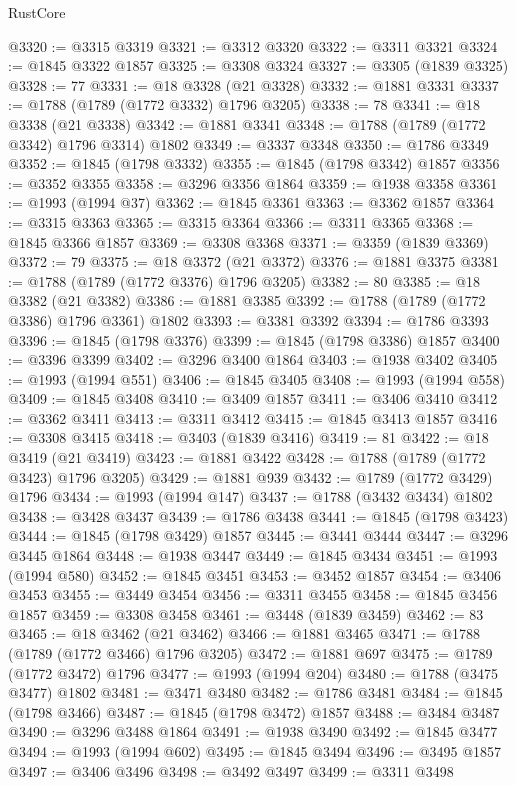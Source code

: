 \begin{lexlean}{RustCore}
\begin{coremodule}
@3320 := @3315 @3319
@3321 := @3312 @3320
@3322 := @3311 @3321
@3324 := @1845 @3322 @1857
@3325 := @3308 @3324
@3327 := @3305 (@1839 @3325)
@3328 := 77
@3331 := @18 @3328 (@21 @3328)
@3332 := @1881 @3331
@3337 := @1788 (@1789 (@1772 @3332) @1796 @3205)
@3338 := 78
@3341 := @18 @3338 (@21 @3338)
@3342 := @1881 @3341
@3348 := @1788 (@1789 (@1772 @3342) @1796 @3314) @1802
@3349 := @3337 @3348
@3350 := @1786 @3349
@3352 := @1845 (@1798 @3332)
@3355 := @1845 (@1798 @3342) @1857
@3356 := @3352 @3355
@3358 := @3296 @3356 @1864
@3359 := @1938 @3358
@3361 := @1993 (@1994 @37)
@3362 := @1845 @3361
@3363 := @3362 @1857
@3364 := @3315 @3363
@3365 := @3315 @3364
@3366 := @3311 @3365
@3368 := @1845 @3366 @1857
@3369 := @3308 @3368
@3371 := @3359 (@1839 @3369)
@3372 := 79
@3375 := @18 @3372 (@21 @3372)
@3376 := @1881 @3375
@3381 := @1788 (@1789 (@1772 @3376) @1796 @3205)
@3382 := 80
@3385 := @18 @3382 (@21 @3382)
@3386 := @1881 @3385
@3392 := @1788 (@1789 (@1772 @3386) @1796 @3361) @1802
@3393 := @3381 @3392
@3394 := @1786 @3393
@3396 := @1845 (@1798 @3376)
@3399 := @1845 (@1798 @3386) @1857
@3400 := @3396 @3399
@3402 := @3296 @3400 @1864
@3403 := @1938 @3402
@3405 := @1993 (@1994 @551)
@3406 := @1845 @3405
@3408 := @1993 (@1994 @558)
@3409 := @1845 @3408
@3410 := @3409 @1857
@3411 := @3406 @3410
@3412 := @3362 @3411
@3413 := @3311 @3412
@3415 := @1845 @3413 @1857
@3416 := @3308 @3415
@3418 := @3403 (@1839 @3416)
@3419 := 81
@3422 := @18 @3419 (@21 @3419)
@3423 := @1881 @3422
@3428 := @1788 (@1789 (@1772 @3423) @1796 @3205)
@3429 := @1881 @939
@3432 := @1789 (@1772 @3429) @1796
@3434 := @1993 (@1994 @147)
@3437 := @1788 (@3432 @3434) @1802
@3438 := @3428 @3437
@3439 := @1786 @3438
@3441 := @1845 (@1798 @3423)
@3444 := @1845 (@1798 @3429) @1857
@3445 := @3441 @3444
@3447 := @3296 @3445 @1864
@3448 := @1938 @3447
@3449 := @1845 @3434
@3451 := @1993 (@1994 @580)
@3452 := @1845 @3451
@3453 := @3452 @1857
@3454 := @3406 @3453
@3455 := @3449 @3454
@3456 := @3311 @3455
@3458 := @1845 @3456 @1857
@3459 := @3308 @3458
@3461 := @3448 (@1839 @3459)
@3462 := 83
@3465 := @18 @3462 (@21 @3462)
@3466 := @1881 @3465
@3471 := @1788 (@1789 (@1772 @3466) @1796 @3205)
@3472 := @1881 @697
@3475 := @1789 (@1772 @3472) @1796
@3477 := @1993 (@1994 @204)
@3480 := @1788 (@3475 @3477) @1802
@3481 := @3471 @3480
@3482 := @1786 @3481
@3484 := @1845 (@1798 @3466)
@3487 := @1845 (@1798 @3472) @1857
@3488 := @3484 @3487
@3490 := @3296 @3488 @1864
@3491 := @1938 @3490
@3492 := @1845 @3477
@3494 := @1993 (@1994 @602)
@3495 := @1845 @3494
@3496 := @3495 @1857
@3497 := @3406 @3496
@3498 := @3492 @3497
@3499 := @3311 @3498

\end{coremodule}
\end{lexlean}
